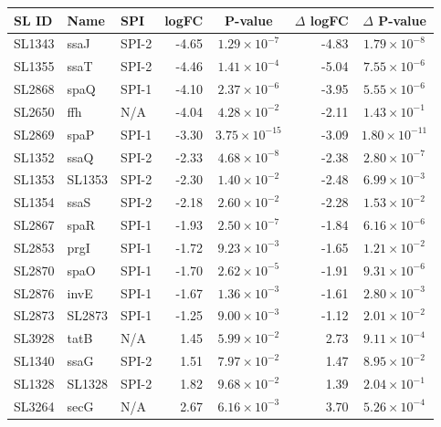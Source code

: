 \begin{table}
\begin{tabular}{ l
    				l
				l
    				r
				c
				r
				c
				}
    \\
     \toprule
    \textbf{SL ID} & \textbf{Name} & \textbf{SPI} & \textbf{logFC} & \textbf{P-value} & \textbf{$\Delta$ logFC} & \textbf{$\Delta$ P-value} \\
    \midrule
    SL1343 & ssaJ & SPI-2 & -4.65 & $1.29\times10^{-7}$ & -4.83 & $1.79\times10^{-8}$\\
    SL1355 & ssaT & SPI-2 & -4.46 & $1.41\times10^{-4}$ & -5.04 & $7.55\times10^{-6}$\\
    SL2868 & spaQ & SPI-1 & -4.10 & $2.37\times10^{-6}$ & -3.95 & $5.55\times10^{-6}$\\
    SL2650 & ffh & N/A & -4.04 & $4.28\times10^{-2}$ & -2.11 & $1.43\times10^{-1}$\\
    SL2869 & spaP & SPI-1 & -3.30 & $3.75\times10^{-15}$ & -3.09 & $1.80\times10^{-11}$\\
    SL1352 & ssaQ & SPI-2 & -2.33 & $4.68\times10^{-8}$ & -2.38 & $2.80\times10^{-7}$\\
    SL1353 & SL1353 & SPI-2 & -2.30 & $1.40\times10^{-2}$ & -2.48 & $6.99\times10^{-3}$\\
    SL1354 & ssaS & SPI-2 & -2.18 & $2.60\times10^{-2}$ & -2.28 & $1.53\times10^{-2}$\\
    SL2867 & spaR & SPI-1 & -1.93 & $2.50\times10^{-7}$ & -1.84 & $6.16\times10^{-6}$\\
    SL2853 & prgI & SPI-1 & -1.72 & $9.23\times10^{-3}$ & -1.65 & $1.21\times10^{-2}$\\
    SL2870 & spaO & SPI-1 & -1.70 & $2.62\times10^{-5}$ & -1.91 & $9.31\times10^{-6}$\\
    SL2876 & invE & SPI-1 & -1.67 & $1.36\times10^{-3}$ & -1.61 & $2.80\times10^{-3}$\\
    SL2873 & SL2873 & SPI-1 & -1.25 & $9.00\times10^{-3}$ & -1.12 & $2.01\times10^{-2}$\\
    SL3928 & tatB & N/A & 1.45 & $5.99\times10^{-2}$ & 2.73 & $9.11\times10^{-4}$\\
    SL1340 & ssaG & SPI-2 & 1.51 & $7.97\times10^{-2}$ & 1.47 & $8.95\times10^{-2}$\\
    SL1328 & SL1328 & SPI-2 & 1.82 & $9.68\times10^{-2}$ & 1.39 & $2.04\times10^{-1}$\\
    SL3264 & secG & N/A & 2.67 & $6.16\times10^{-3}$ & 3.70 & $5.26\times10^{-4}$\\
    \bottomrule
    \end{tabular}%
    \label{tab:bss}%
\end{table}

